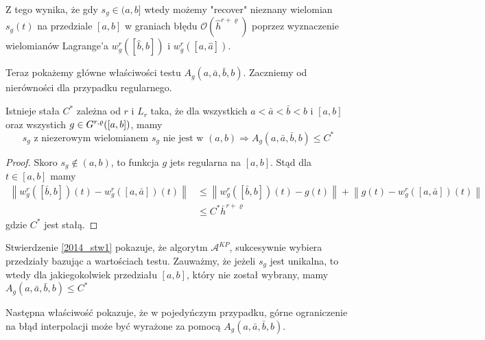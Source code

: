 \documentclass[oik, pdftex, robocza, man]{mgrwms}
\begin{document}
    Z tego wynika, że gdy $s_{g} \in (a,b]$ wtedy możemy "recover" nieznany wielomian $s_{g}(t)$ na przedziale $[a,b]$ w graniach błędu $\mathcal{O}(\hat{h}^{r+\varrho})$ poprzez wyznaczenie wielomianów Lagrange'a $w_{g}^{r}([\hat{b}, b])$ i $w_{g}^{r}([a, \hat{a}])$.

    Teraz pokażemy główne właściwości testu $A_{g}(a, \bar{a}, \bar{b}, b)$. Zaczniemy od nierówności dla przypadku regularnego.

    \begin{stw} \label{2014_stw1}
        Istnieje stała $C^{*}$ zależna od $r$ i $L_{r}$ taka, że dla wszystkich $a < \bar{a} < \bar{b} < b$ i $[a,b]$ oraz wszystich $g \in G^{r,\varrho}([a,b])$, mamy
        \begin{equation*}
            s_{g} \text{ z niezerowym wielomianem } s_{g} \text{ nie jest w } (a,b) \Longrightarrow A_{g}(a, \bar{a}, \bar{b}, b) \leq C^{*}
        \end{equation*}
    \end{stw}
    \begin{proof}
        Skoro $s_{g} \notin (a, b)$, to funkcja $g$ jets regularna na $[a, b]$. Stąd dla $t \in[a,b]$ mamy
        \begin{equation*}
            \begin{aligned}
                \left\|w_{g}^{r}([\bar{b}, b])(t)-w_{g}^{r}([a, \bar{a}])(t)\right\| & \leq\left\|w_{g}^{r}([\bar{b}, b])(t)-g(t)\right\|+\left\|g(t)-w_{g}^{r}([a, \bar{a}])(t)\right\| \\
                & \leq C^{*} \bar{h}^{r+\varrho}
            \end{aligned}
        \end{equation*}
    gdzie $C^{*}$ jest stałą.
    \end{proof}

    \begin{uw}
        Stwierdzenie \eqref{2014_stw1} pokazuje, że algorytm $\mathcal{A}^{KP}$, sukcesywnie wybiera przedziały bazując a wartościach testu. Zauważmy, że jeżeli $s_{g}$ jest unikalna, to wtedy dla jakiegokolwiek przedziału $[a,b]$, który nie został wybrany, mamy $A_{g}(a, \bar{a}, \bar{b}, b) \leq C^{*}$
    \end{uw}

    Następna właściwość pokazuje, że w pojedyńczym przypadku, górne ograniczenie na błąd interpolacji może być wyrażone za pomocą $A_{g}(a, \bar{a}, \bar{b}, b)$.
\end{document}
